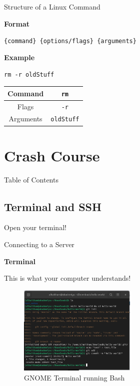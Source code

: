 \documentclass{beamer}
\begin{document}
\begin{frame}{Structure of a Linux Command}
	\begin{Large}
		\textbf{Format} \\
	\end{Large}
	\texttt{\{command\} \{options/flags\} \{arguments\}}

	\vspace{0.3cm}

	\begin{Large}
		\textbf{Example} \\
	\end{Large}
	\texttt{rm -r oldStuff}

	\vspace{0.3cm}

	\begin{tabular}{|c|c|}
		\hline
		Command & \texttt{rm} \\
		\hline
		Flags & \texttt{-r} \\
		\hline
		Arguments & \texttt{oldStuff} \\
		\hline
	\end{tabular}
\end{frame}

\section{Crash Course}
\begin{frame}{Table of Contents}
	\tableofcontents[currentsection]
\end{frame}

\subsection{Terminal and SSH}
\begin{frame}
	\begin{center}
		\Huge Open your terminal!
	\end{center}
\end{frame}

\begin{frame}{Connecting to a Server}
	\begin{Large}
		\textbf{Terminal} \\
	\end{Large}
	This is what your computer understands!
	\begin{figure}
		\centering
		\includegraphics[width=0.5\textwidth]{terminal.png}
		\caption{GNOME Terminal running Bash}
	\end{figure}
\end{frame}
\end{document}

